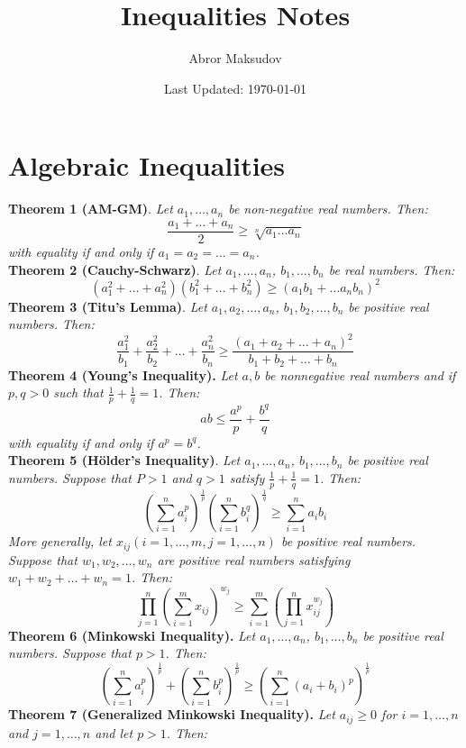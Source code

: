 \documentclass[a4paper,11pt]{article}
\title{Inequalities Notes}
\author{Abror Maksudov}
\date{Last Updated: \today}
\begin{document}
\maketitle

%
%
\section{Algebraic Inequalities}
\textbf{Theorem 1 (AM-GM)}. \textit{Let $a_1, \dots, a_n$ be non-negative real numbers. Then:}
\[
\frac{a_1 + \dots + a_n}{2} \geq \sqrt[n]{a_1 \dots a_n}
\]
\textit{with equality if and only if $a_1 = a_2 = \dots = a_n$.} \\[10pt]
%
%
\textbf{Theorem 2 (Cauchy-Schwarz)}. \textit{Let $a_1, \dots, a_n$, $b_1, \dots, b_n$ be real numbers. Then:}
\[
(a_1^2 + \dots + a_n^2)(b_1^2 + \dots + b_n^2) \geq (a_1b_1 + \dots a_nb_n)^2
\]
%
%
\textbf{Theorem 3 (Titu's Lemma)}. \textit{Let $a_1, a_2, \dots, a_n$, $b_1, b_2, \dots, b_n$ be positive real numbers. Then:}
\[
\frac{a_1^2}{b_1} + \frac{a_2^2}{b_2} + \dots + \frac{a_n^2}{b_n} \geq \frac{(a_1 + a_2 + \dots + a_n)^2}{b_1 + b_2 + \dots + b_n}  
\]
%
%
\textbf{Theorem 4 (Young's Inequality).} \textit{Let $a, b$ be nonnegative real numbers and if $p, q > 0 $ such that $\frac{1}{p} + \frac{1}{q} = 1$. Then:}
\[
ab \leq \frac{a^p}{p} + \frac{b^q}{q}
\]
\textit{with equality if and only if $a^p = b^q$.} \\[10pt]
%
%
\textbf{Theorem 5 (Hölder's Inequality)}. \textit{Let $a_1, \dots, a_n$, $b_1, \dots, b_n$ be positive real numbers. Suppose that  $P > 1$ and $q > 1$ satisfy $\frac{1}{p} + \frac{1}{q} = 1$. Then:}
\[
\left( \sum_{i=1}^n a_i^p \right) ^ \frac{1}{p} \left( \sum_{i=1}^n b_i^q \right) ^ \frac{1}{q} \geq \sum_{i=1}^n a_ib_i
\]
\textit{More generally, let $x_{ij} (i=1, \dots, m, j=1, \dots, n)$ be positive real numbers. Suppose that $w_1, w_2, \dots, w_n$ are positive real numbers satisfying $w_1 + w_2 + \dots + w_n = 1$. Then:}
\[
\prod_{j=1}^{n} \left( \sum_{i=1}^m x_{ij} \right)^{w_j} \geq \sum_{i=1}^m \left( \prod_{j=1}^n x_{ij}^{w_j} \right)
\]
%
%
\textbf{Theorem 6 (Minkowski Inequality).} \textit{Let $a_1, \dots, a_n$, $b_1, \dots, b_n$ be positive real numbers. Suppose that $p > 1$. Then:}
\[
\left( \sum_{i=1}^n a_i^p \right)^\frac{1}{p} + \left( \sum_{i=1}^n b_i^p \right)^\frac{1}{p} \geq \left( \sum_{i=1}^n (a_i + b_i)^p \right)^\frac{1}{p}
\]
%
%
\textbf{Theorem 7 (Generalized Minkowski Inequality).} \textit{Let $a_{ij} \geq 0$ for $i=1, \dots, n$ and $j=1, \dots, n$ and let $p>1$. Then:}
\end{document}
